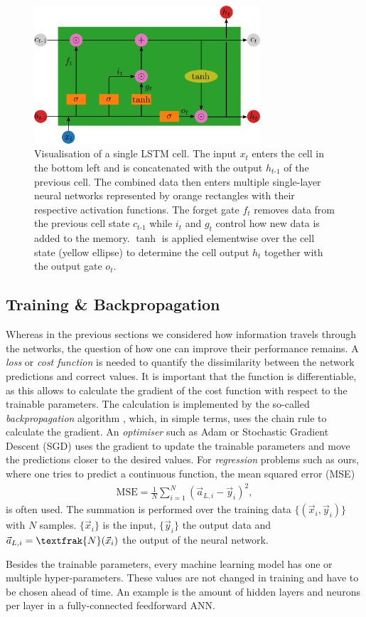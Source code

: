 \begin{figure}[h]
	\centering
	\includegraphics[width=0.75\textwidth]{img/lstm}
	\caption{Visualisation of a single LSTM cell. The input $x_t$ enters the cell in the bottom left and is concatenated with the output $h_{t\text{-}1}$ of the previous cell. The combined data then enters multiple single-layer neural networks represented by orange rectangles with their respective activation functions. The forget gate $f_t$ removes data from the previous cell state $c_{t\text{-}1}$ while $i_t$ and $g_t$ control how new data is added to the memory. $\tanh$ is applied elementwise over the cell state (yellow ellipse) to determine the cell output $h_t$ together with the output gate $o_t$.}
	\label{lstm}
\end{figure}

\newpage

\subsection{Training \& Backpropagation} \label{trainbackprop}
Whereas in the previous sections we considered how information travels through the networks, the question of how one can improve their performance remains.
A \textit{loss} or \textit{cost function} is needed to quantify the dissimilarity between the network predictions and correct values.
It is important that the function is differentiable, as this allows to calculate the gradient of the cost function with respect to the trainable parameters.
The calculation is implemented by the so-called \textit{backpropagation} algorithm \cite{rumelhart1986learning, nielsenneural}, which, in simple terms, uses the chain rule to calculate the gradient.
An \textit{optimiser} such as Adam \cite{kingma2017adam} or Stochastic Gradient Descent (SGD) uses the gradient to update the trainable parameters and move the predictions closer to the desired values.
For \textit{regression} problems such as ours, where one tries to predict a continuous function, the mean squared error (MSE)
\begin{align*}
\mathrm{MSE} = \frac{1}{N} \sum_{i=1}^N (\vec{a}_{L, i} - \vec{y}_i)^2,
\end{align*}
is often used.
The summation is performed over the training data $\{(\vec{x}_i, \vec{y}_i)\}$ with $N$ samples.
$\{\vec{x}_i\}$ is the input, $\{\vec{y}_i\}$ the output data and $\vec{a}_{L, i} = \textfrak{N}(\vec{x}_i)$ the output of the neural network.

Besides the trainable parameters, every machine learning model has one or multiple hyper-parameters.
These values are not changed in training and have to be chosen ahead of time.
An example is the amount of hidden layers and neurons per layer in a fully-connected feedforward ANN.
